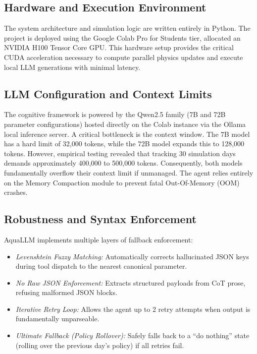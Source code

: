 \documentclass[conference]{IEEEtran}
\begin{document}
\subsection{Hardware and Execution Environment}
The system architecture and simulation logic are written entirely in Python. The project is deployed using the Google Colab Pro for Students tier, allocated an NVIDIA H100 Tensor Core GPU. This hardware setup provides the critical CUDA acceleration necessary to compute parallel physics updates and execute local LLM generations with minimal latency.

\subsection{LLM Configuration and Context Limits}
The cognitive framework is powered by the Qwen2.5 family (7B and 72B parameter configurations) hosted directly on the Colab instance via the Ollama local inference server. A critical bottleneck is the context window. The 7B model has a hard limit of 32,000 tokens, while the 72B model expands this to 128,000 tokens. However, empirical testing revealed that tracking 30 simulation days demands approximately 400,000 to 500,000 tokens. Consequently, both models fundamentally overflow their context limit if unmanaged. The agent relies entirely on the Memory Compaction module to prevent fatal Out-Of-Memory (OOM) crashes.

\subsection{Robustness and Syntax Enforcement}
AquaLLM implements multiple layers of fallback enforcement:
\begin{itemize}
    \item \textit{Levenshtein Fuzzy Matching:} Automatically corrects hallucinated JSON keys during tool dispatch to the nearest canonical parameter.
    \item \textit{No Raw JSON Enforcement:} Extracts structured payloads from CoT prose, refusing malformed JSON blocks.
    \item \textit{Iterative Retry Loop:} Allows the agent up to 2 retry attempts when output is fundamentally unparseable.
    \item \textit{Ultimate Fallback (Policy Rollover):} Safely falls back to a ``do nothing'' state (rolling over the previous day's policy) if all retries fail.
\end{itemize}
\end{document}
